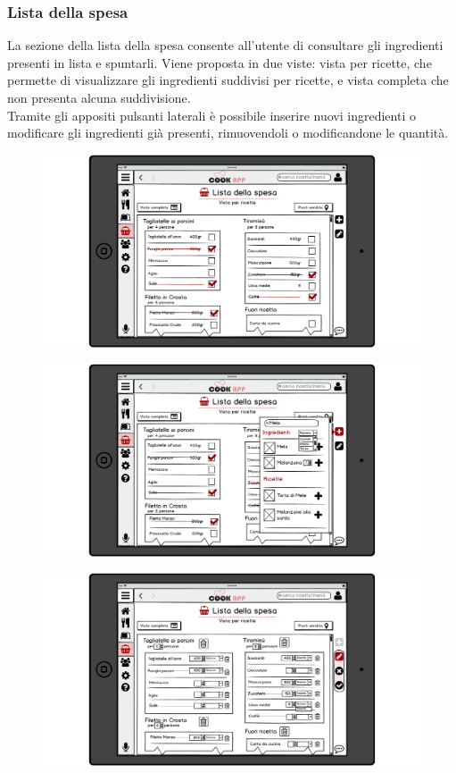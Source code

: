 \begin{itemize}
\subsubsection{Lista della spesa}
La sezione della lista della spesa consente
all'utente di consultare gli ingredienti presenti in lista e
spuntarli. Viene proposta in due viste: vista per ricette, che permette
di visualizzare gli ingredienti suddivisi per ricette, e vista
completa che non presenta alcuna suddivisione.\\
Tramite gli appositi pulsanti laterali è possibile inserire nuovi
ingredienti o modificare gli ingredienti già presenti, rimuovendoli o
modificandone le quantità.
\begin{figure}[H]
	\centering
	\includegraphics[width=0.95\linewidth]{img/mockup/spesa.png}
\end{figure}
\begin{figure}[H]
	\centering
	\includegraphics[width=0.95\linewidth]{img/mockup/spesa-add.png}
\end{figure}
\begin{figure}[H]
	\centering
	\includegraphics[width=0.95\linewidth]{img/mockup/spesa-edit.png}

\end{figure}
\end{itemize}
